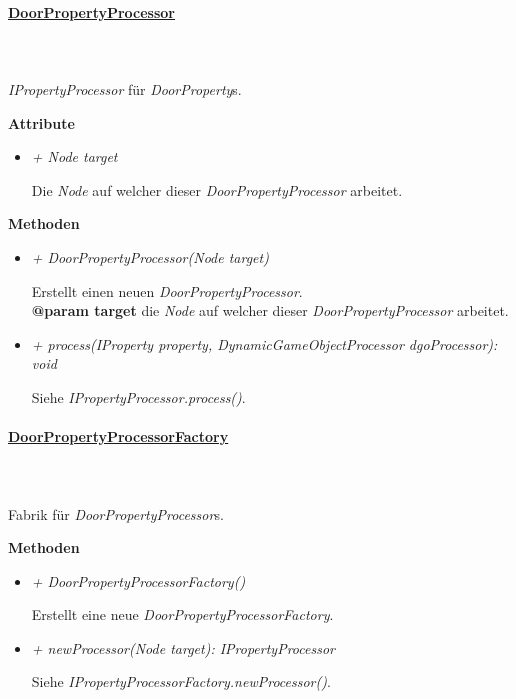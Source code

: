     \pagebreak
    \paragraph{\underline{DoorPropertyProcessor}} \mbox{}\\
    \\
    \textit{IPropertyProcessor} für \textit{DoorProperty}s.\par

        \textbf{Attribute}
        \begin{itemize}
            \item \textit{+ Node target}
                \begin{leftbar}[0.9\linewidth]
                    Die \textit{Node} auf welcher dieser \textit{DoorPropertyProcessor} arbeitet.
                \end{leftbar}
        \end{itemize}
        \textbf{Methoden}
        \begin{itemize}
            \item \textit{+ DoorPropertyProcessor(Node target)}
                \begin{leftbar}[0.9\linewidth]
                    Erstellt einen neuen \textit{DoorPropertyProcessor}.\\
                    \textbf{@param target} die \textit{Node} auf welcher dieser \textit{DoorPropertyProcessor} arbeitet.
                \end{leftbar}
            \item \textit{+ process(IProperty property, DynamicGameObjectProcessor dgoProcessor): void}
                \begin{leftbar}[0.9\linewidth]
                    Siehe \textit{IPropertyProcessor.process()}.
                \end{leftbar}
        \end{itemize}

    \paragraph{\underline{DoorPropertyProcessorFactory}} \mbox{}\\
    \\
    Fabrik für \textit{DoorPropertyProcessor}s.\par

        \textbf{Methoden}
        \begin{itemize}
            \item \textit{+ DoorPropertyProcessorFactory()}
                \begin{leftbar}[0.9\linewidth]
                    Erstellt eine neue \textit{DoorPropertyProcessorFactory}.
                \end{leftbar}
            \item \textit{+ newProcessor(Node target): IPropertyProcessor}
                \begin{leftbar}[0.9\linewidth]
                    Siehe \textit{IPropertyProcessorFactory.newProcessor()}.
                \end{leftbar}
        \end{itemize}

